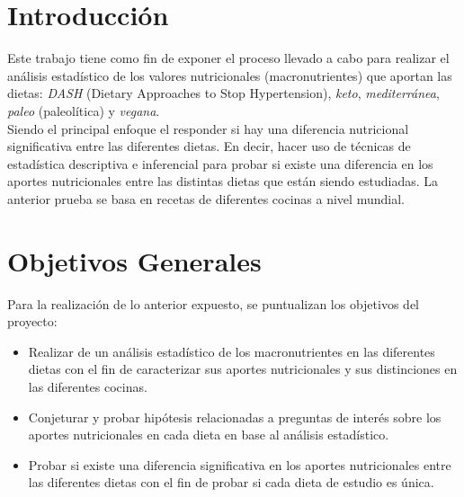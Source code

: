 \documentclass[12pt,a4paper]{article}
\begin{document}
\newpage

\tableofcontents

\newpage

\section{Introducción}

    Este trabajo tiene como fin de exponer el proceso llevado a cabo para 
    realizar el análisis estadístico de los valores nutricionales (macronutrientes) 
    que aportan las dietas: \emph{DASH} (Dietary Approaches to Stop Hypertension), 
    \emph{keto}, \emph{mediterránea}, \emph{paleo} (paleolítica) y \emph{vegana}.\\

    Siendo el principal enfoque el responder si hay una diferencia nutricional 
    significativa entre las diferentes dietas. En decir, hacer uso de 
    técnicas de estadística descriptiva e inferencial para probar si existe 
    una diferencia en los aportes nutricionales entre las distintas dietas que 
    están siendo estudiadas. La anterior prueba se basa en recetas de diferentes 
    cocinas a nivel mundial.


\section{Objetivos Generales}

    Para la realización de lo anterior expuesto, se puntualizan los objetivos del 
    proyecto:
    \begin{itemize}
        \item Realizar de un análisis estadístico de los macronutrientes en las 
        diferentes dietas con el fin de caracterizar sus aportes nutricionales y 
        sus distinciones en las diferentes cocinas.

        \item Conjeturar y probar hipótesis relacionadas a preguntas de interés 
        sobre los aportes nutricionales en cada dieta en base al análisis estadístico. 

        \item Probar si existe una diferencia significativa en los aportes 
        nutricionales entre las diferentes dietas con el fin de probar si cada 
        dieta de estudio es única.
    \end{itemize}
\end{document}
